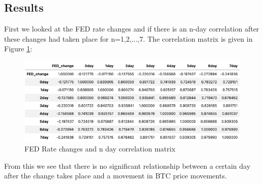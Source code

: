 \documentclass[12pt]{article}
\begin{document}
\subsection{Results}
First we looked at the FED rate changes and if there is an n-day correlation after these changes had taken place for n=1,2,...,7. The correlation matrix is given in Figure \ref{fig:corr}:
\begin{figure}[H]
   \includegraphics[scale=0.7]{research_project/text/paper/fed_chng_corr.png}
   \centering
   \caption{FED Rate changes and n day correlation matrix}
   \label{fig:corr}
\end{figure}
From this we see that there is no significant relationship between a certain day after the change takes place and a movement in BTC price movements.\\
\end{document}
